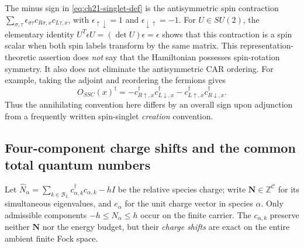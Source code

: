 The minus sign in \eqref{eq:ch21-singlet-def} is the antisymmetric spin
contraction \(\sum_{\sigma,\tau}\epsilon_{\sigma\tau}
 c_{R\sigma,x}c_{L\tau,x}\), with
\(\epsilon_{\uparrow\downarrow}=1\) and
\(\epsilon_{\downarrow\uparrow}=-1\).  For \(U\in SU(2)\), the elementary
identity \(U^{T}\epsilon U=(\det U)\epsilon=\epsilon\) shows that this
contraction is a spin scalar when both spin labels transform by the same
matrix.  This representation-theoretic assertion does \emph{not} say that
the Hamiltonian possesses spin-rotation symmetry.  It also does not
eliminate the antisymmetric CAR ordering.  For example, taking the adjoint
and reordering the fermions gives
\begin{equation}
 O_{SSC}(x)^\dagger
  =-c_{R\uparrow,x}^\dagger c_{L\downarrow,x}^\dagger
    -c_{L\uparrow,x}^\dagger c_{R\downarrow,x}^\dagger.
 \label{eq:ch21-singlet-adjoint}
\end{equation}
Thus the annihilating convention here differs by an overall sign upon
adjunction from a frequently written spin-singlet \emph{creation} convention.

\subsection*{Four-component charge shifts and the common total quantum numbers}

Let \(\widehat N_\alpha=\sum_{k\in\mathcal B_L}
 c_{\alpha,k}^\dagger c_{\alpha,k}-hI\) be the relative species charge;
write \(\mathbf N\in\mathbb Z^{\mathcal C}\) for its simultaneous
eigenvalues, and \(e_\alpha\) for the unit charge vector in species
\(\alpha\).  Only admissible components \(-h\leq N_\alpha\leq h\)
occur on the finite carrier.  The \(c_{\alpha,k}\) preserve neither
\(\mathbf N\) nor the energy budget, but their \emph{charge shifts} are
exact on the entire ambient finite Fock space.

